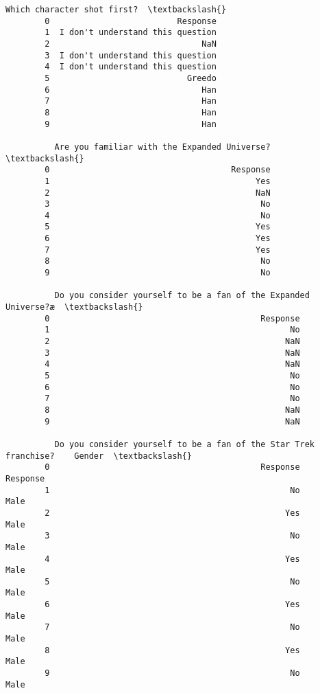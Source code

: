 \documentclass[11pt]{article}
\begin{document}
\begin{Verbatim}[commandchars=\\\{\}]
                Which character shot first?  \textbackslash{}
        0                          Response   
        1  I don't understand this question   
        2                               NaN   
        3  I don't understand this question   
        4  I don't understand this question   
        5                            Greedo   
        6                               Han   
        7                               Han   
        8                               Han   
        9                               Han   
        
          Are you familiar with the Expanded Universe?  \textbackslash{}
        0                                     Response   
        1                                          Yes   
        2                                          NaN   
        3                                           No   
        4                                           No   
        5                                          Yes   
        6                                          Yes   
        7                                          Yes   
        8                                           No   
        9                                           No   
        
          Do you consider yourself to be a fan of the Expanded Universe?æ  \textbackslash{}
        0                                           Response                 
        1                                                 No                 
        2                                                NaN                 
        3                                                NaN                 
        4                                                NaN                 
        5                                                 No                 
        6                                                 No                 
        7                                                 No                 
        8                                                NaN                 
        9                                                NaN                 
        
          Do you consider yourself to be a fan of the Star Trek franchise?    Gender  \textbackslash{}
        0                                           Response                Response   
        1                                                 No                    Male   
        2                                                Yes                    Male   
        3                                                 No                    Male   
        4                                                Yes                    Male   
        5                                                 No                    Male   
        6                                                Yes                    Male   
        7                                                 No                    Male   
        8                                                Yes                    Male   
        9                                                 No                    Male   
        

\end{Verbatim}
\end{document}
